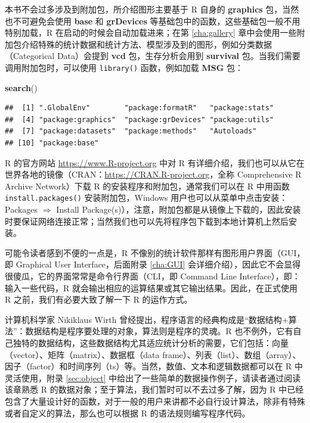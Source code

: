 \documentclass[
  b5paper,
  UTF8,twoside]{book}
\newenvironment{Shaded}{\begin{snugshade}}{\end{snugshade}}
\newcommand{\FunctionTok}[1]{\textcolor[rgb]{0.13,0.29,0.53}{\textbf{#1}}}
\newcommand{\NormalTok}[1]{#1}
\begin{document}
本书不会过多涉及到附加包，所介绍图形主要基于 R 自身的 \textbf{graphics} 包，当然也不可避免会使用 \textbf{base} 和 \textbf{grDevices} 等基础包中的函数，这些基础包一般不用特别加载，R 在启动的时候会自动加载进来；在第 \ref{cha:gallery} 章中会使用一些附加包介绍特殊的统计数据和统计方法、模型涉及到的图形，例如分类数据（Categorical Data）会提到 \textbf{vcd} 包，生存分析会用到 \textbf{survival} 包。当我们需要调用附加包时，可以使用 \texttt{library()} 函数，例如加载 \textbf{MSG} 包：

\begin{Shaded}
\begin{Highlighting}[]
\FunctionTok{search}\NormalTok{()}
\end{Highlighting}
\end{Shaded}

\begin{verbatim}
##  [1] ".GlobalEnv"        "package:formatR"   "package:stats"    
##  [4] "package:graphics"  "package:grDevices" "package:utils"    
##  [7] "package:datasets"  "package:methods"   "Autoloads"        
## [10] "package:base"
\end{verbatim}

R 的官方网站 \url{https://www.R-project.org} 中对 R 有详细介绍，我们也可以从它在世界各地的镜像（CRAN：\url{https://CRAN.R-project.org}，全称 Comprehensive R Archive Network）下载 R 的安装程序和附加包，通常我们可以在 R 中用函数 \texttt{install.packages()} 安装附加包，Windows 用户也可以从菜单中点击安装：Packages \(\Rightarrow\) Install Package(s)），注意，附加包都是从镜像上下载的，因此安装时要保证网络连接正常；当然我们也可以先将程序包下载到本地计算机上然后安装。

可能令读者感到不便的一点是，R 不像别的统计软件那样有图形用户界面（GUI，即 Graphical User Interface，后面附录 \ref{cha:GUI} 会详细介绍），因此它不会显得很傻瓜，它的界面常常是命令行界面（CLI，即 Command Line Interface），即：输入一些代码，R 就会输出相应的运算结果或其它输出结果。因此，在正式使用 R 之前，我们有必要大致了解一下 R 的运作方式。

计算机科学家 Nikiklaus Wirth 曾经提出，程序语言的经典构成是``数据结构+算法''：数据结构是程序要处理的对象，算法则是程序的灵魂。R 也不例外，它有自己独特的数据结构，这些数据结构尤其适应统计分析的需要，它们包括：向量（vector）、矩阵（matrix）、数据框（data frame）、列表（list）、数组（array）、因子（factor）和时间序列（ts）等。当然，数值、文本和逻辑数据都可以在 R 中灵活使用，附录 \ref{sec:object} 中给出了一些简单的数据操作例子，请读者通过阅读该章熟悉 R 的数据对象；至于算法，我们暂时可以不去过多了解，因为 R 中已经包含了大量设计好的函数，对于一般的用户来讲都不必自行设计算法，除非有特殊或者自定义的算法，那么也可以根据 R 的语法规则编写程序代码。
\end{document}
